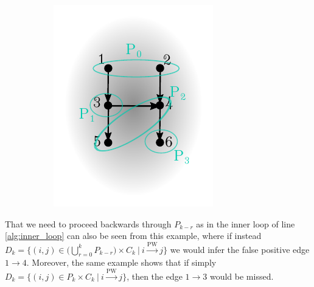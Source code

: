 \documentclass[12pt]{article}
\def\pwgc{\overset{\text{PW}}{\rightarrow}}  %
\begin{document}
\begin{example}
\begin{figure}
\begin{subfigure}[b]{0.45\textwidth}
      \includegraphics[width=\linewidth]{example_algorithm2.pdf}
    \end{subfigure}
  \end{figure}

  That we need to proceed backwards through $P_{k - r}$ as in the
  inner loop of line \ref{alg:inner_loop} can also be seen from this
  example, where if instead
  $D_k = \{(i, j) \in \Big(\bigcup_{r = 0}^k P_{k - r}\Big) \times
  C_k\ |\ i \pwgc j \}$ we would infer the false positive edge
  $1 \rightarrow 4$.  Moreover, the same example shows that if simply
  $D_k = \{(i, j) \in P_k \times C_k\ |\ i \pwgc j \}$, then the edge
  $1 \rightarrow 3$ would be missed.
\end{example}
\end{document}
